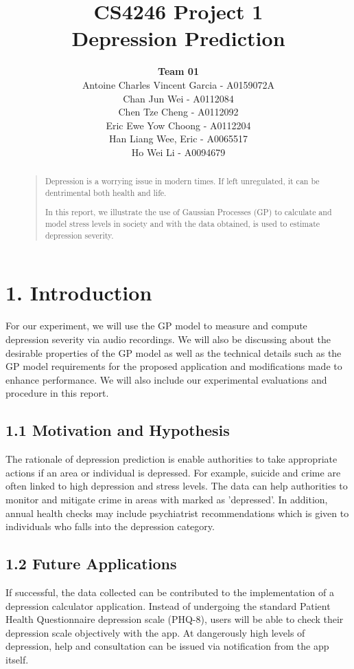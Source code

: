 \documentclass{article}
\title{
	CS4246 Project 1\\ Depression Prediction
}
\author{
	{\bf Team 01} \\
	Antoine Charles Vincent Garcia - A0159072A\\
	Chan Jun Wei - A0112084\\
	Chen Tze Cheng - A0112092\\
	Eric Ewe Yow Choong - A0112204\\
	Han Liang Wee, Eric - A0065517\\
	Ho Wei Li - A0094679\\
}
\begin{document}
 	\maketitle

	\begin{abstract}
	\begin{quote}
	Depression is a worrying issue in modern times. If left unregulated, it can be dentrimental both health and life.
	
	In this report, we illustrate the use of Gaussian Processes (GP) to calculate and model stress levels in society and with the data obtained, is used to estimate depression severity. \\
	\end{quote}
	\end{abstract}
	
	\section{1. Introduction}
	For our experiment, we will use the GP model to measure and compute depression severity via audio recordings. We will also be discussing about the desirable properties of the GP model as well as the technical details such as the GP model requirements for the proposed application and modifications made to enhance performance. We will also include our experimental evaluations and procedure in this report.\\

	\subsection{1.1 Motivation and Hypothesis}
	The rationale of depression prediction is enable authorities to take appropriate actions if an area or individual is depressed. For example, suicide and crime are often linked to high depression and stress levels. The data can help authorities to monitor and mitigate crime in areas with marked as 'depressed'. In addition, annual health checks may include psychiatrist recommendations which is given to individuals who falls into the depression category. 

	\subsection{1.2 Future Applications}
	If successful, the data collected can be contributed to the implementation of a depression calculator application. Instead of undergoing the standard Patient Health Questionnaire depression scale (PHQ-8), users will be able to check their depression scale objectively with the app. At dangerously high levels of depression, help and consultation can be issued via notification from the app itself. 
	
\end{document}
